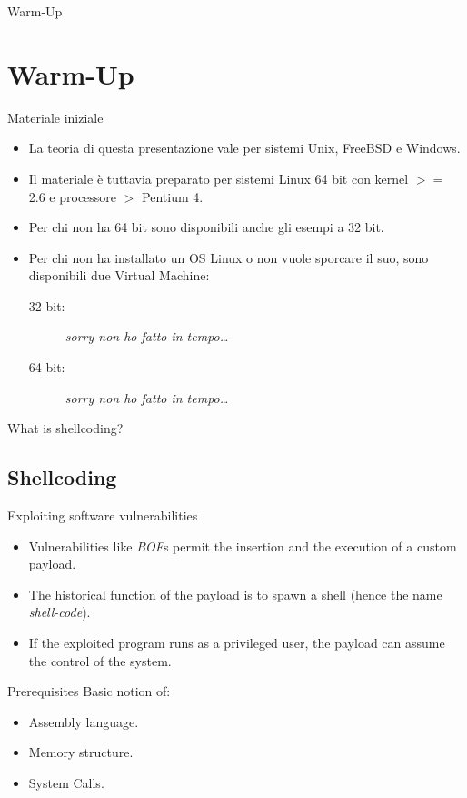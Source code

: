 \begin{frame}{Warm-Up}
	\section{Warm-Up}
	\begin{block}{Materiale iniziale}
		\begin{itemize}
			\item La teoria di questa presentazione vale per sistemi Unix, FreeBSD e Windows.
			\item Il materiale è tuttavia preparato per sistemi Linux 64 bit con
				kernel $>=$ 2.6 e processore $>$ Pentium 4.
			\item Per chi non ha 64 bit sono disponibili anche gli esempi a 32 bit.
			\item Per chi non ha installato un OS Linux o non vuole sporcare il suo,
				sono disponibili due Virtual Machine:
				\begin{description}
					\item[32 bit:]\emph{sorry non ho fatto in tempo\ldots}
					\item[64 bit:]\emph{sorry non ho fatto in tempo\ldots}
				\end{description}
		\end{itemize}
	\end{block}
\end{frame}

\begin{frame}{What is shellcoding?}
	\subsection{Shellcoding}
	\begin{block}{Exploiting software vulnerabilities}
		\begin{itemize}
			\item Vulnerabilities like \emph{BOF}s permit the insertion and the
				execution of a custom payload.
			\item The historical function of the payload is to spawn a shell (hence
				the name \emph{shell-code}).
			\item If the exploited program runs as a privileged user, the payload can
				assume the control of the system.
		\end{itemize}
	\end{block}
	\begin{block}{Prerequisites}
		Basic notion of:
		\begin{itemize}
			\item Assembly language.
			\item Memory structure.
			\item System Calls.
		\end{itemize}
	\end{block}
\end{frame}

